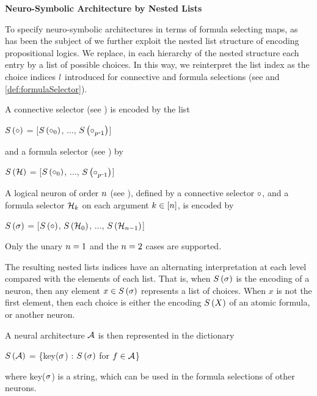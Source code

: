 \textbf{Neuro-Symbolic Architecture by Nested Lists}

To specify neuro-symbolic architectures in terms of formula selecting maps, as has been the subject of  we further exploit the nested list structure of encoding propositional logics.
We replace, in each hierarchy of the nested structure each entry by a list of possible choices.
In this way, we reinterpret the list index as the choice indices $l$ introduced for connective and formula selections (see  and \ref{def:formulaSelector}).

A connective selector (see ) is encoded by the list
	\begin{centeredcode}
			$S\left(\circ\right)$ 
			= [$S\left(\circ_{0}\right)$, $\ldots$, $\synencodingof{\exconnective_{\parlegdim\shortminus1}}$]
	\end{centeredcode}
and a formula selector (see ) by
	\begin{centeredcode}
			$S\left(\mathcal{H}\right)$ 
			= [$S\left(\circ_{0}\right)$, $\ldots$, $\synencodingof{\exconnective_{\parlegdim\shortminus1}}$]
	\end{centeredcode}
A logical neuron of order $n$ (see ), defined by a connective selector $\circ$, and a formula selector $\mathcal{H}_k$ on each argument $k\in[n]$, is encoded by
		\begin{centeredcode}
			$S\left(\sigma\right)$ 
			= [$S\left(\circ\right)$, $S\left(\mathcal{H}_0\right)$, $\ldots$,  $S\left(\mathcal{H}_{n-1}\right)$]
		\end{centeredcode}
Only the unary $n=1$ and the $n=2$ cases are supported.


The resulting nested lists indices have an alternating interpretation at each level compared with the elements of each list.
That is, when $S\left(\sigma\right)$ is the encoding of a neuron, then any element $x\in S\left(\sigma\right)$ represents a list of choices.
When $x$ is not the first element, then each choice is either the encoding $S\left(X\right)$ of an atomic formula, or another neuron. 

A neural architecture $\mathcal{A}$ is then represented in the dictionary
\begin{centeredcode}
	$S\left(\mathcal{A}\right)$ = \{key($\sigma$) : $S\left(\sigma\right)$ for $f\in\mathcal{A}$\}
\end{centeredcode}
where key($\sigma$) is a string, which can be used in the formula selections of other neurons.

